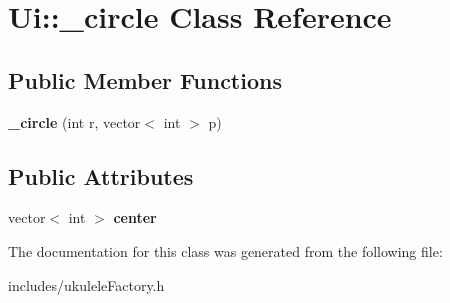 \hypertarget{class_ui_1_1__circle}{}\section{Ui\+:\+:\+\_\+circle Class Reference}
\label{class_ui_1_1__circle}
\subsection*{Public Member Functions}
\begin{DoxyCompactItemize}
\item 
\hypertarget{class_ui_1_1__circle_a18c96caaa5cdba264362121b68456559}{}\label{class_ui_1_1__circle_a18c96caaa5cdba264362121b68456559} 
{\bfseries \+\_\+circle} (int r, vector$<$ int $>$ p)
\end{DoxyCompactItemize}
\subsection*{Public Attributes}
\begin{DoxyCompactItemize}
\item 
\hypertarget{class_ui_1_1__circle_a205019322d4840579175e7ea1ae67bb1}{}\label{class_ui_1_1__circle_a205019322d4840579175e7ea1ae67bb1} 
vector$<$ int $>$ {\bfseries center}
\end{DoxyCompactItemize}


The documentation for this class was generated from the following file\+:\begin{DoxyCompactItemize}
\item 
includes/ukulele\+Factory.\+h\end{DoxyCompactItemize}

